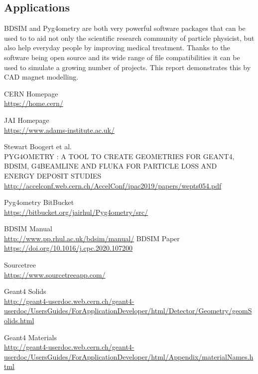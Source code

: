 \documentclass[12pt,a4paper]{article}
\begin{document}
\subsection{Applications}
BDSIM and Pyg4ometry are both very powerful software packages that can be used to to aid not only the scientific research community of particle physicist, but also help everyday people by improving medical treatment. Thanks to the software being open source and its wide range of file compatibilities it can be used to simulate a growing number of projects. This report demonstrates this by CAD magnet modelling.


\newpage
\begin{thebibliography}{1}

	CERN Homepage\\
	\url{https://home.cern/}
	
	JAI Homepage\\
	\url{https://www.adams-institute.ac.uk/}

	Stewart Boogert et al.\\
	PYG4OMETRY : A TOOL TO CREATE GEOMETRIES FOR GEANT4,\\
BDSIM, G4BEAMLINE AND FLUKA FOR PARTICLE LOSS AND\\
ENERGY DEPOSIT STUDIES\\
	\url{http://accelconf.web.cern.ch/AccelConf/ipac2019/papers/wepts054.pdf}

	
	Pyg4ometry BitBucket\\
	\url{https://bitbucket.org/jairhul/Pyg4ometry/src/}
	
	\bibitem{}
		BDSIM Manual\\
		\url{http://www.pp.rhul.ac.uk/bdsim/manual/}
	\bibitem{}
		BDSIM Paper\\
		\url{https://doi.org/10.1016/j.cpc.2020.107200}
		
		Sourcetree\\
		\url{https://www.sourcetreeapp.com/}
		
	\bibitem{}
	Geant4 Solids\\
	\url{http://geant4-userdoc.web.cern.ch/geant4-userdoc/UsersGuides/ForApplicationDeveloper/html/Detector/Geometry/geomSolids.html}
	
	Geant4 Materials\\
	\url{http://geant4-userdoc.web.cern.ch/geant4-userdoc/UsersGuides/ForApplicationDeveloper/html/Appendix/materialNames.html}
	

\end{thebibliography}
\end{document}
